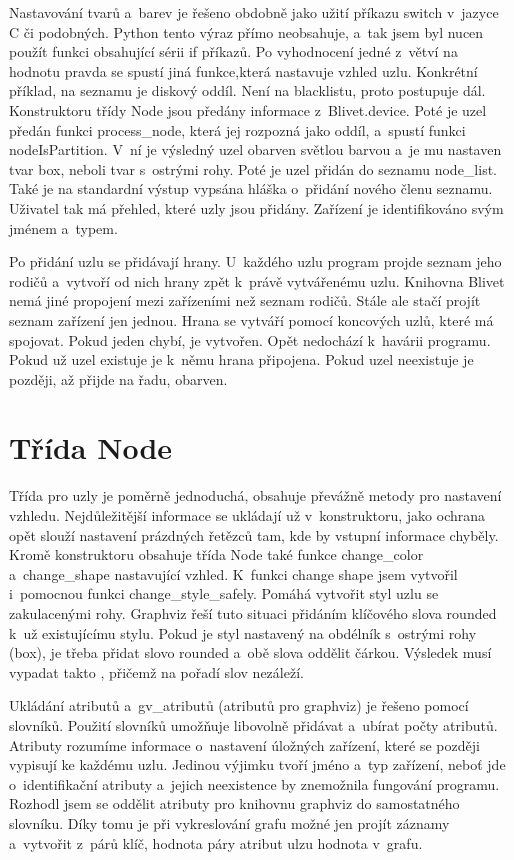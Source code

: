 \documentclass[color,table,oneside,nolot,nolof]{fithesis}
\begin{document}
	Nastavování tvarů a~barev je řešeno obdobně jako užití příkazu switch v~jazyce C či podobných. Python tento výraz přímo neobsahuje, a~tak jsem byl nucen použít funkci obsahující 
	sérii if příkazů. Po vyhodnocení jedné z~větví na hodnotu pravda se spustí jiná funkce,která nastavuje vzhled uzlu. Konkrétní příklad, na seznamu je diskový oddíl. Není na blacklistu,
	proto postupuje dál. Konstruktoru třídy Node jsou předány informace z~Blivet.device. Poté je uzel předán funkci process\_node, která jej rozpozná jako oddíl, a~spustí funkci 
	nodeIsPartition. V~ní je výsledný uzel obarven světlou barvou a~je mu nastaven tvar box, neboli tvar s~ostrými rohy. Poté je uzel přidán do seznamu node\_list. Také je na
	standardní výstup vypsána hláška o~přidání nového členu seznamu. Uživatel tak má přehled, které uzly jsou přidány. Zařízení je identifikováno svým jménem a~typem.

	Po přidání uzlu se přidávají hrany. U~každého uzlu program projde seznam jeho rodičů a~vytvoří od nich hrany zpět k~právě vytvářenému uzlu. 
	Knihovna Blivet nemá jiné propojení mezi zařízeními než seznam rodičů. Stále ale stačí projít seznam zařízení jen jednou. Hrana se vytváří pomocí koncových uzlů, které má spojovat.
	Pokud jeden chybí, je vytvořen. Opět nedochází k~havárii programu. Pokud už uzel existuje je k~němu hrana připojena. Pokud uzel neexistuje je později, až přijde na řadu, obarven.

\section{Třída Node}
	Třída pro uzly je poměrně jednoduchá, obsahuje převážně metody pro nastavení vzhledu. Nejdůležitější informace se ukládají už v~konstruktoru, jako ochrana opět slouží nastavení
	prázdných řetězců tam, kde by vstupní informace chyběly. Kromě konstruktoru obsahuje třída Node také funkce change\_color a~change\_shape nastavující vzhled. K~funkci change shape 
	jsem vytvořil i~pomocnou funkci change\_style\_safely. Pomáhá vytvořit styl uzlu se zakulacenými rohy. Graphviz řeší tuto situaci přidáním klíčového slova rounded k~už 
	existujícímu stylu. Pokud je styl nastavený na obdélník s~ostrými rohy (box), je třeba přidat slovo rounded a~obě slova oddělit čárkou. Výsledek musí vypadat takto ,
	přičemž na pořadí slov nezáleží.

	Ukládání atributů a~gv\_atributů (atributů pro graphviz) je řešeno pomocí slovníků. Použití slovníků umožňuje libovolně přidávat a~ubírat počty atributů. 
	Atributy rozumíme informace o~nastavení úložných zařízení, které se později vypisují ke každému uzlu. Jedinou výjimku tvoří jméno a~typ zařízení, neboť jde
	o~identifikační atributy a~jejich neexistence by znemožnila fungování programu. Rozhodl jsem se oddělit atributy pro knihovnu graphviz do samostatného slovníku. Díky tomu je při
	vykreslování grafu možné jen projít záznamy a~vytvořit z~párů klíč, hodnota páry atribut ulzu hodnota v~grafu. 
\end{document}
